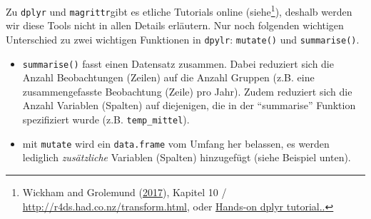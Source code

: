 \documentclass[]{book}
\newenvironment{Shaded}{\begin{snugshade}}{\end{snugshade}}
\newcommand{\CommentTok}[1]{\textcolor[rgb]{0.56,0.35,0.01}{\textit{#1}}}
\newcommand{\DataTypeTok}[1]{\textcolor[rgb]{0.13,0.29,0.53}{#1}}
\newcommand{\KeywordTok}[1]{\textcolor[rgb]{0.13,0.29,0.53}{\textbf{#1}}}
\newcommand{\NormalTok}[1]{#1}
\newcommand{\OperatorTok}[1]{\textcolor[rgb]{0.81,0.36,0.00}{\textbf{#1}}}
\newcommand{\StringTok}[1]{\textcolor[rgb]{0.31,0.60,0.02}{#1}}
\providecommand{\tightlist}{%
  \setlength{\itemsep}{0pt}\setlength{\parskip}{0pt}}
\let\rmarkdownfootnote\footnote%
\def\footnote{\protect\rmarkdownfootnote}
\begin{document}
Zu \texttt{dplyr} und \texttt{magrittr}gibt es etliche Tutorials online (siehe\footnote{Wickham and Grolemund (\protect\hyperlink{ref-wickham2017}{2017}), Kapitel 10 / \url{http://r4ds.had.co.nz/transform.html}, oder \href{https://youtu.be/jWjqLW-u3hc}{Hands-on dplyr tutorial..}}), deshalb werden wir diese Tools nicht in allen Details erläutern. Nur noch folgenden wichtigen Unterschied zu zwei wichtigen Funktionen in \texttt{dpylr}: \texttt{mutate()} und \texttt{summarise()}.

\begin{itemize}
\tightlist
\item
  \texttt{summarise()} fasst einen Datensatz zusammen. Dabei reduziert sich die Anzahl Beobachtungen (Zeilen) auf die Anzahl Gruppen (z.B. eine zusammengefasste Beobachtung (Zeile) pro Jahr). Zudem reduziert sich die Anzahl Variablen (Spalten) auf diejenigen, die in der ``summarise'' Funktion spezifiziert wurde (z.B. \texttt{temp\_mittel}).
\item
  mit \texttt{mutate} wird ein \texttt{data.frame} vom Umfang her belassen, es werden lediglich \emph{zusätzliche} Variablen (Spalten) hinzugefügt (siehe Beispiel unten).
\end{itemize}

\begin{Shaded}
\end{Shaded}
\end{document}
